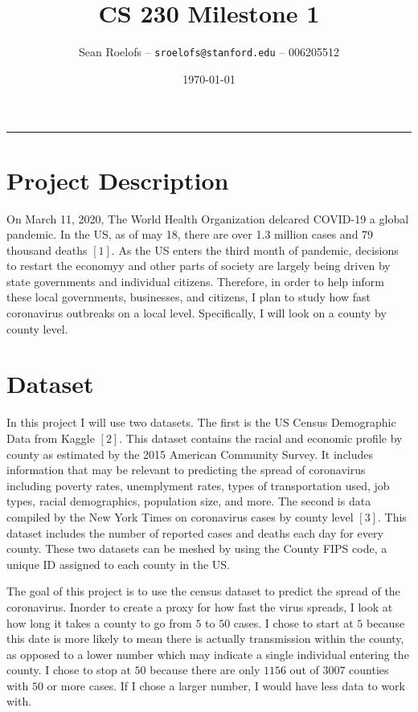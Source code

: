 \documentclass[12pt]{article}
\title{CS 230 Milestone 1}
\author{Sean Roelofs -- \texttt{sroelofs@stanford.edu} -- 006205512}
\date{\today}
\begin{document}
\maketitle

\vspace{-0.3in}

\rule{\linewidth}{0.4pt}

\section{Project Description}
    On March 11, 2020, The World Health Organization delcared COVID-19 a global pandemic. In the US, as of may 18, there are over 1.3 million cases and 79 thousand deaths $[1]$. As the US enters the third month of pandemic, decisions to restart the economyy and other parts of society are largely being driven by state governments and individual citizens. Therefore, in order to help inform these local governments, businesses, and citizens, I plan to study how fast coronavirus outbreaks on a local level. Specifically, I will look on a county by county level.


\section{Dataset}

    In this project I will use two datasets. The first is the US Census Demographic Data from Kaggle $[2]$. This dataset contains the racial and economic profile by county as estimated by the 2015 American Community Survey. It includes information that may be relevant to predicting the spread of coronavirus including poverty rates, unemplyment rates, types of transportation used, job types, racial demographics, population size, and more.
    The second is data compiled by the New York Times on coronavirus cases by county level $[3]$. This dataset includes the number of reported cases and deaths each day for every county. These two datasets can be meshed by using the County FIPS code, a unique ID assigned to each county in the US.

    The goal of this project is to use the census dataset to predict the spread of the coronavirus. Inorder to create a proxy for how fast the virus spreads, I look at how long it takes a county to go from $5$ to $50$ cases. I chose to start at $5$ because this date is more likely to mean there is actually transmission within the county, as opposed to a lower number which may indicate a single individual entering the county. I chose to stop at $50$ because there are only $1156$ out of $3007$ counties with $50$ or more cases. If I chose a larger number, I would have less data to work with.
\end{document}
